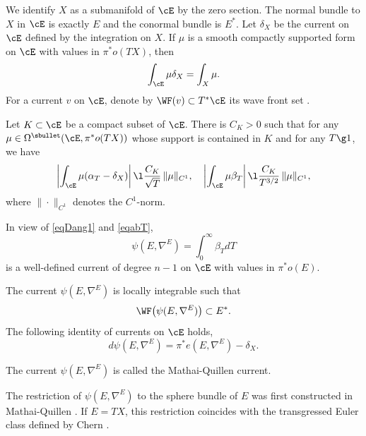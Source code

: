 We identify $X$ as a submanifold of $\cE$ by the zero section. The normal bundle
to $X$ in $\cE$ is exactly $E$ and the conormal bundle is $E^{*}$.
Let $\delta_{X}$ be the current on $\cE$ defined by the integration
on $X$. If $\mu$ is a smooth compactly supported form on $\cE$ with
values in $\pi^{*}o(TX)$, then
\begin{equation*}
\int_{\cE}\mu\delta_{X}=\int_{X}\mu.
\end{equation*}
For a current $v$ on $\cE$, denote by $\WF(v)\subset
T^{*}\cE$ its wave front set \cite[\S 8.1]{HormanderBook1}.

\begin{thm}
Let $K\subset
\cE$ be a compact subset of $\cE$. There is $C_{K}>0$ such that for
any $\mu\in
\Omega^{\sbullet}(\cE,\pi^{*}o(TX))$ whose support is contained in $K$
and for any $T\g 1$, we have
\begin{equation}\label{eqabT}
\left| \int_{\cE}\mu(\alpha_{T}-\delta_{X})\right|\l
\frac{C_{K}}{\sqrt{T}}\,\|\mu\|_{C^{1}},\quad\left|\int_{\cE}\mu \beta_{T}\right|\l
\frac{C_{K}}{T^{3/2}}\,\|\mu\|_{C^{1}},
\end{equation}
where $\|{\cdot}\|_{C^1}$ denotes the $C^{1}$-norm.
\end{thm}

In view of \eqref{eqDang1} and \eqref{eqabT},
\begin{equation*}
\psi(E,\nabla^{E})=\int_{0}^{\infty}\beta_{T}dT
\end{equation*}
is a well-defined current of degree $n-1$ on $\cE$ with values in $\pi^{*}o(E)$.

\begin{thm}
The current $\psi(E,\nabla^{E})$ is locally
integrable such that
\begin{equation*}\label{WFphi}
\WF \big(\psi(E,\nabla^{E})\big)\subset E^{*}.
\end{equation*}
The following identity of currents
on $\cE$ holds,
\begin{equation*}
d\psi(E,\nabla^{E})=\pi^{*}e(E,\nabla^{E})-\delta_{X}.
\end{equation*}
\end{thm}

\begin{defin}
The current $\psi(E,\nabla^{E})$ is called the Mathai-Quillen
current.
\end{defin}

\begin{re}
The restriction of $\psi(E,\nabla^{E})$ to the
sphere bundle of $E$
was first constructed in Mathai-Quillen \cite[\S 7]{MathaiQuillen}.
If $E=TX$, this restriction coincides with the transgressed Euler
class defined by Chern \cite{Chern2}.
\end{re}

